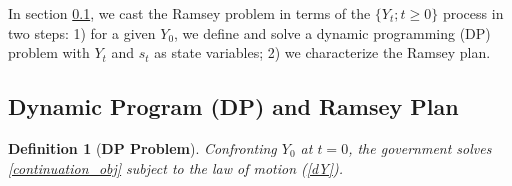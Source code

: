 \documentclass[12pt]{article}
\newtheorem{definition}{Definition}
\begin{document}
 
In section \ref{sec:DPdefine1}, we cast  the Ramsey problem  in terms of  the $\{Y_t; t\geq 0\}$ process in   two steps: 1) for a given $Y_0$, we define and solve  a dynamic programming (DP) problem with $Y_t$ and $s_t$ as state variables; 2) we characterize the Ramsey plan. %






\subsection{Dynamic Program (DP) and Ramsey Plan} \label{sec:DPdefine1}


\begin{definition} [{\bf  DP Problem}] \label{definDP1}
	Confronting  $Y_0$ at $t=0$, 
	the government  solves  \eqref{continuation_obj}
	subject to the law of motion (\ref{dY}). %
\end{definition} 
\end{document}
